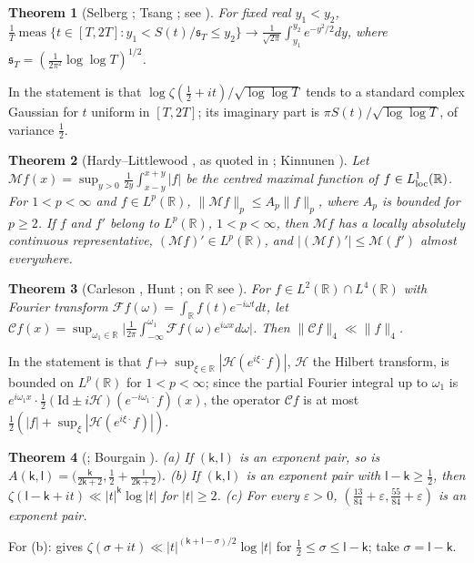 \documentclass[preprint,12pt]{elsarticle}
\numberwithin{equation}{section}
\theoremstyle{plain}
\newtheorem{theorem}{Theorem}[section]
\theoremstyle{definition}
\theoremstyle{remark}
\newcommand{\R}{\mathbb R}
\begin{document}
\begin{theorem}[Selberg {\cite{Selberg1946a}}; Tsang {\cite{Tsang1984}}; see {\cite[(1.1)]{FazzariGerspachMinelli2025}}]\label{thm:known_selberg_clt}
For fixed real $y_1<y_2$, $\frac1T\operatorname{meas}\{t\in[T,2T]:y_1<S(t)/\mathfrak s_T\le y_2\}\to\frac1{\sqrt{2\pi}}\int_{y_1}^{y_2}e^{-y^2/2}dy$, where $\mathfrak s_T=(\frac1{2\pi^2}\log\log T)^{1/2}$.
\end{theorem}
In \cite{FazzariGerspachMinelli2025} the statement is that $\log\zeta(\frac12+it)/\sqrt{\log\log T}$ tends to a standard complex Gaussian for $t$ uniform in $[T,2T]$; its imaginary part is $\pi S(t)/\sqrt{\log\log T}$, of variance $\frac12$.

\begin{theorem}[Hardy--Littlewood {\cite[Thm.~I.1]{Stein1970}}, as quoted in {\cite[(1.2)]{Kinnunen1997}}; Kinnunen {\cite[Thm.~1.4]{Kinnunen1997}}]\label{thm:known_maximal}
Let $\mathcal Mf(x)=\sup_{y>0}\frac1{2y}\int_{x-y}^{x+y}|f|$ be the centred maximal function of $f\in L^1_{\rm loc}(\R)$. For $1<p<\infty$ and $f\in L^p(\R)$, $\|\mathcal Mf\|_p\le A_p\|f\|_p$, where $A_p$ is bounded for $p\ge2$. If $f$ and $f'$ belong to $L^p(\R)$, $1<p<\infty$, then $\mathcal Mf$ has a locally absolutely continuous representative, $(\mathcal Mf)'\in L^p(\R)$, and $|(\mathcal Mf)'|\le\mathcal M(f')$ almost everywhere.
\end{theorem}

\begin{theorem}[Carleson {\cite{Carleson1966}}, Hunt {\cite{Hunt1968}}; on $\R$ see {\cite{Lerner2013}}]\label{thm:known_carleson}
For $f\in L^2(\R)\cap L^4(\R)$ with Fourier transform $\mathcal Ff(\omega)=\int_\R f(t)e^{-i\omega t}dt$, let $\mathcal Cf(x)=\sup_{\omega_1\in\R}\bigl|\frac1{2\pi}\int_{-\infty}^{\omega_1}\mathcal Ff(\omega)e^{i\omega x}d\omega\bigr|$. Then $\|\mathcal Cf\|_4\ll\|f\|_4$.
\end{theorem}
In \cite{Lerner2013} the statement is that $f\mapsto\sup_{\xi\in\R}|\mathcal H(e^{i\xi\cdot}f)|$, $\mathcal H$ the Hilbert transform, is bounded on $L^p(\R)$ for $1<p<\infty$; since the partial Fourier integral up to $\omega_1$ is $e^{i\omega_1x}\cdot\frac12(\mathrm{Id}\pm i\mathcal H)(e^{-i\omega_1\cdot}f)(x)$, the operator $\mathcal Cf$ is at most $\frac12(|f|+\sup_\xi|\mathcal H(e^{i\xi\cdot}f)|)$.

\begin{theorem}[{\cite[Lemma~2.8 and (7.57)]{Ivic1985}}; Bourgain {\cite[\S5, Thm.~6]{Bourgain2017}}]\label{thm:known_exponents}
(a) If $(\mathsf k,\mathsf l)$ is an exponent pair, so is $A(\mathsf k,\mathsf l)=\bigl(\frac{\mathsf k}{2\mathsf k+2},\frac12+\frac{\mathsf l}{2\mathsf k+2}\bigr)$. (b) If $(\mathsf k,\mathsf l)$ is an exponent pair with $\mathsf l-\mathsf k\ge\frac12$, then $\zeta(\mathsf l-\mathsf k+it)\ll|t|^{\mathsf k}\log|t|$ for $|t|\ge2$. (c) For every $\varepsilon>0$, $(\frac{13}{84}+\varepsilon,\frac{55}{84}+\varepsilon)$ is an exponent pair.
\end{theorem}
For (b): \cite[(7.57)]{Ivic1985} gives $\zeta(\sigma+it)\ll|t|^{(\mathsf k+\mathsf l-\sigma)/2}\log|t|$ for $\frac12\le\sigma\le\mathsf l-\mathsf k$; take $\sigma=\mathsf l-\mathsf k$.
\end{document}
